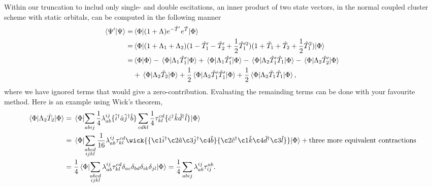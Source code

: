     

    Within our truncation to includ only single- and double escitations,
    an inner product of two state vectors, in the normal coupled cluster scheme
    with static orbitals, can be computed in the following manner
    \begin{equation}
        \begin{aligned}
            \braket{\Psi'}{\Psi} 
            =& \mel{\Phi}
            {
                (1 + \Lambda)e^{-\hat{T}'} e^{\hat{T}}
            }
            {\Phi} \\
            =&
            \mel{\Phi}{
            (1 + \Lambda_1 + \Lambda_2)
            (1 - \hat{T}'_1 - \hat{T}'_2 + \frac{1}{2}\hat{T}'^2_1) 
            (1 + \hat{T}_1 + \hat{T}_2 + \frac{1}{2}\hat{T}^2_1)
            }{\Phi} \\
            =& \braket{\Phi} - \mel{\Phi}{\Lambda_1\hat{T}'_1}{\Phi} 
                + \mel{\Phi}{\Lambda_1\hat{T}'_1}{\Phi}
                - \mel{\Phi}{\Lambda_2\hat{T}'_1\hat{T}_1}{\Phi}
                - \mel{\Phi}{\Lambda_2\hat{T}'_2}{\Phi} \\
            \ & + \mel{\Phi}{\Lambda_2\hat{T}_2}{\Phi}
                + \frac{1}{2}\mel{\Phi}{\Lambda_2\hat{T}'_1\hat{T}'_1}{\Phi}
                + \frac{1}{2}\mel{\Phi}{\Lambda_2\hat{T}_1\hat{T}_1}{\Phi},
        \end{aligned}
    \end{equation}
    where we have ignored terms that would give a zero-contribution.
    Evaluating the remainding terms can be done with your 
    favourite method. Here is an example using Wick's theorem,
    \begin{equation}
        \begin{aligned}
            \mel{\Phi}{\Lambda_2\hat{T}_2}{\Phi} 
            &= \mel{\Phi} 
            {
            \sum_{abij} \frac{1}{4}\lambda^{ij}_{ab}
                \{\hat{i}^\dagger \hat{a} \hat{j}^\dagger \hat{b} \}
            \sum_{cdkl} \frac{1}{4}\tau^{cd}_{kl}
                \{\hat{c}^\dagger \hat{k} \hat{d}^\dagger \hat{l} \}           
            } 
            {\Phi} \\
            &= \mel{\Phi} 
            {
            \sum_{\substack{abcd\\ijkl}} \frac{1}{16}\lambda^{ij}_{ab} \tau^{cd}_{kl}
                \wick{
                \{\c1{\hat{i}^\dagger} \c2{\hat{a}} \c3{\hat{j}^\dagger} \c4{\hat{b}} \}
                \{\c2{\hat{c}^\dagger} \c1{\hat{k}} \c4{\hat{d}^\dagger} \c3{\hat{l}} \}
                } 
            } 
            {\Phi}  + \text{three more equivalent contractions} \\
            &= 
            \frac{1}{4} \mel{\Phi} 
            {
                \sum_{\substack{abcd \\ ijkl}} \lambda^{ij}_{ab} \tau^{cd}_{kl} 
                \delta_{ac} 
                \delta_{bd}
                \delta_{ik} 
                \delta_{jl}
            } {\Phi}
            = \frac{1}{4} \sum_{abij} \lambda^{ij}_{ab} \tau^{ab}_{ij}.
        \end{aligned}
    \end{equation}

